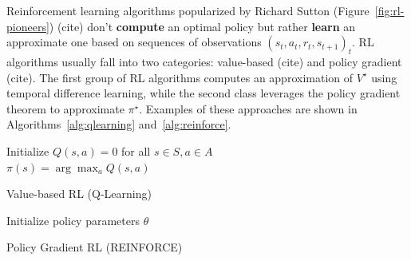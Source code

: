 Reinforcement learning algorithms popularized by Richard Sutton (Figure~\ref{fig:rl-pioneers}) (cite) don't \textbf{compute} an optimal policy but rather \textbf{learn} an approximate one based on sequences of observations ${(s_t, a_t, r_t, s_{t+1})}_t$.
RL algorithms usually fall into two categories: value-based (cite) and policy gradient (cite). The first group of RL algorithms computes an approximation of $V^{\star}$ using temporal difference learning, while the second class leverages the policy gradient theorem to approximate $\pi^{\star}$. Examples of these approaches are shown in Algorithms~\ref{alg:qlearning} and~\ref{alg:reinforce}.

\begin{algorithm}
    Initialize $Q(s,a) = 0$ for all $s \in S, a \in A$ \\
    $\pi(s) = \arg\max_a Q(s,a)$ 
    \caption{Value-based RL (Q-Learning)}\label{alg:qlearning}
\end{algorithm}

\begin{algorithm}
    Initialize policy parameters $\theta$ \\
    \caption{Policy Gradient RL (REINFORCE)}\label{alg:reinforce}
\end{algorithm}

